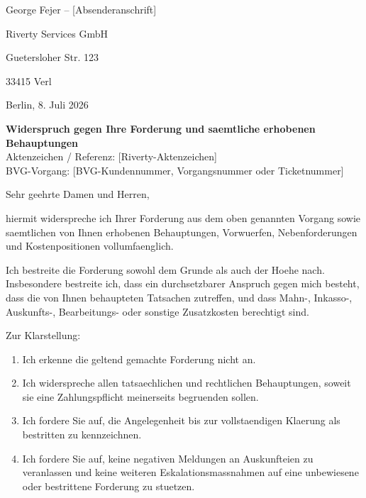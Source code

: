 \documentclass[11pt,a4paper]{article}
\newcommand{\placeholder}[1]{[#1]}
\begin{document}
\pagestyle{empty}

\vspace*{25mm}
\begin{minipage}[t][45mm][t]{85mm}
{\scriptsize George Fejer -- \placeholder{Absenderanschrift}}\par\vspace{3mm}
Riverty Services GmbH\par
Guetersloher Str. 123\par
33415 Verl
\end{minipage}

\vspace{13mm}

\begin{flushright}
Berlin, 8. Juli 2026
\end{flushright}

\textbf{Widerspruch gegen Ihre Forderung und saemtliche erhobenen Behauptungen}\\
Aktenzeichen / Referenz: \placeholder{Riverty-Aktenzeichen}\\
BVG-Vorgang: \placeholder{BVG-Kundennummer, Vorgangsnummer oder Ticketnummer}

\vspace{0.8em}

Sehr geehrte Damen und Herren,

hiermit widerspreche ich Ihrer Forderung aus dem oben genannten Vorgang sowie saemtlichen von Ihnen erhobenen Behauptungen, Vorwuerfen, Nebenforderungen und Kostenpositionen vollumfaenglich.

Ich bestreite die Forderung sowohl dem Grunde als auch der Hoehe nach. Insbesondere bestreite ich, dass ein durchsetzbarer Anspruch gegen mich besteht, dass die von Ihnen behaupteten Tatsachen zutreffen, und dass Mahn-, Inkasso-, Auskunfts-, Bearbeitungs- oder sonstige Zusatzkosten berechtigt sind.

Zur Klarstellung:
\begin{enumerate}
  \item Ich erkenne die geltend gemachte Forderung nicht an.
  \item Ich widerspreche allen tatsaechlichen und rechtlichen Behauptungen, soweit sie eine Zahlungspflicht meinerseits begruenden sollen.
  \item Ich fordere Sie auf, die Angelegenheit bis zur vollstaendigen Klaerung als bestritten zu kennzeichnen.
  \item Ich fordere Sie auf, keine negativen Meldungen an Auskunfteien zu veranlassen und keine weiteren Eskalationsmassnahmen auf eine unbewiesene oder bestrittene Forderung zu stuetzen.
\end{enumerate}
\end{document}
